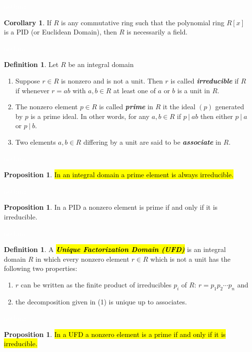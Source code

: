 \documentclass{article}
\theoremstyle{definition}
\newtheorem{prop}[thm]{Proposition}
\newtheorem{cor}[thm]{Corollary}
\newtheorem{defn}[thm]{Definition}
\newcommand{\nl}{\textcolor{white}{nothing}}
\begin{document}
\nl

\begin{cor}
If $R$ is any commutative ring such that the polynomial ring $R[x]$ is a PID (or Euclidean Domain), then $R$ is necessarily a field.
\end{cor}

\nl

\begin{defn}
Let $R$ be an integral domain
\begin{enumerate}
\item Suppose $r\in R$ is nonzero and is not a unit. Then $r$ is called \textit{\textbf{irreducible}} if $R$ if whenever $r = ab$ with $a,b\in R$ at least one of $a$ or $b$ is a unit in $R$.
\item The nonzero element $p\in R$ is called \textbf{\textit{prime}} in $R$ it the ideal $(p)$ generated by $p$ is a prime ideal. In other words, for any $a,b\in R$ if $p\ |\ ab$ then either $p\ |\ a$ or $p\ |\ b$.
\item Two elements $a,b\in R$ differing by a unit are said to be \textit{\textbf{associate}} in $R$.
\end{enumerate}
\end{defn}

\nl

\begin{prop}
\hl{In an integral domain a prime element is always irreducible.}
\end{prop}

\nl

\begin{prop}
In a PID a nonzero element is prime if and only if it is irreducible.
\end{prop}

\nl

\begin{defn}
A \hl{\textit{\textbf{Unique Factorization Domain (UFD)}}} is an integral domain $R$ in which every nonzero element $r\in R$ which is not a unit has the following two properties:
\begin{enumerate}
\item $r$ can be written as the finite product of irreducibles $p_i$ of $R$: $r = p_1p_2\cdots p_n$ and
\item the decomposition given in (1) is unique up to associates. 
\end{enumerate}
\end{defn}

\nl

\begin{prop}
\hl{In a UFD a nonzero element is a prime if and only if it is irreducible.}
\end{prop}
\end{document}
